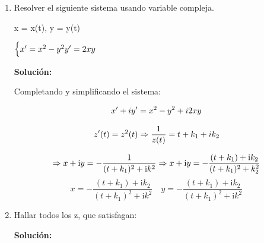 \documentclass[a4paper,12pt]{article}
\begin{document}
\begin{enumerate}
\textbf{Solución:}

Recordando la fórmula de MOIVRE

\[ (\cos \theta + \text{isen} \theta)^n = \cos n \theta + \text{isen} n \theta \]

Usando el teorema del binomio

\[ \cos n \theta + \text{isen} n \theta = \sum_{k=0}^{n} (-1)^{(k-1)/2} \binom{n}{k} \cos^{n-k} \theta \text{sen}^k \theta \]

\[ \sum_{k=0}^{n} (-1)^{(k-1)/2} \binom{n}{k} \cos^{n-k} \theta \text{sen}^k \theta \]

Sabemos que: \( i^{2k} = (-1)^k \)

\[
\cos n\theta + \mathrm{i} \sin n\theta = 
\sum_{k=0}^{n} \cos n^k \theta (-1)^{k^2} \sin^k \theta + 
\sum_{k=1}^{n} \cos n^k \theta (-1)^{(k-1)^2} \sin^k \theta 
\]
$\begin{cases}
x' = x^2 - y^2 y' = 2xy
\end{cases}$

Luego tomamos partes reales e imaginarias a ambos miembros obtenemos las
identidades solicitadas.

    \item Resolver el siguiente sistema usando variable compleja.

x = x(t), y = y(t)

$\begin{cases}
x' = x^2 - y^2\newline
y' = 2xy
\end{cases}$

\textbf{Solución:}

Completando y simplificando el sistema:

\[
x' + i y' = x^2 - y^2 + i 2xy\newline
\]


\[
z'(t) = z^2(t) \Rightarrow \frac{1}{z(t)} = t + k_1 + i k_2 \newline
\]

\[
\Rightarrow x + \mathrm{i} y = - \frac{1}{(t + k_1)^2 + \mathrm{i} k^2} \Rightarrow x + \mathrm{i} y = - \frac{(t + k_1) + \mathrm{i} k_2}{(t + k_1)^2 + k_2^2} \newline
\]
\[
x = - \frac{(t + k_1) + \mathrm{i} k_2}{(t + k_1)^2 + \mathrm{i} k^2} \quad y = - \frac{(t + k_1) + \mathrm{i} k_2}{(t + k_1)^2 + \mathrm{i} k^2}
\]


    \item Hallar todos los z, que satisfagan:

\textbf{Solución:}


\end{enumerate}
\end{document}
